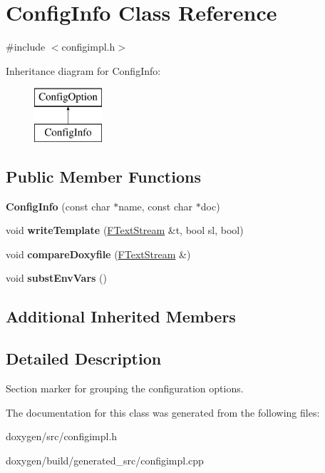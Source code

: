 \hypertarget{class_config_info}{}\section{Config\+Info Class Reference}
\label{class_config_info}


{\ttfamily \#include $<$configimpl.\+h$>$}

Inheritance diagram for Config\+Info\+:\begin{figure}[H]
\begin{center}
\leavevmode
\includegraphics[height=2.000000cm]{class_config_info}
\end{center}
\end{figure}
\subsection*{Public Member Functions}
\begin{DoxyCompactItemize}
\item 
\mbox{\label{class_config_info_ab6f35b01ca89e544443687839171a835}} 
{\bfseries Config\+Info} (const char $\ast$name, const char $\ast$doc)
\item 
\mbox{\label{class_config_info_a8effa474d1ed0481ad0bdd506cffcc63}} 
void {\bfseries write\+Template} (\mbox{\hyperlink{class_f_text_stream}{F\+Text\+Stream}} \&t, bool sl, bool)
\item 
\mbox{\label{class_config_info_a5b1e1e30cacfda3a172171b2fbb1e598}} 
void {\bfseries compare\+Doxyfile} (\mbox{\hyperlink{class_f_text_stream}{F\+Text\+Stream}} \&)
\item 
\mbox{\label{class_config_info_ac8e7248d13bb1c291c9e1547ff1a1fa0}} 
void {\bfseries subst\+Env\+Vars} ()
\end{DoxyCompactItemize}
\subsection*{Additional Inherited Members}


\subsection{Detailed Description}
Section marker for grouping the configuration options. 

The documentation for this class was generated from the following files\+:\begin{DoxyCompactItemize}
\item 
doxygen/src/configimpl.\+h\item 
doxygen/build/generated\+\_\+src/configimpl.\+cpp\end{DoxyCompactItemize}
